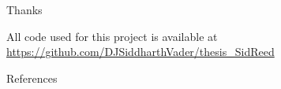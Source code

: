 \documentclass[dvipsnames]{beamer}
\newcommand{\myurl}[2][blue]{{\color{#1}\url{#2}}}
\begin{document}
\begin{frame}{Thanks}
\begin{multicols}{2}
\begin{minipage}[b][20ex][t]{\linewidth}
\begin{figure}[htb!]
    \end{figure}
    \end{minipage}
    \begin{minipage}[b][20ex][t]{\linewidth}
        \vspace{0.1in}
        All code used for this project is available at
        \myurl[blue]{https://github.com/DJSiddharthVader/thesis_SidReed}
    \end{minipage}
    \end{multicols}
\end{frame}
\begin{frame}{References}
    \printbibliography
\end{frame}
\end{document}
